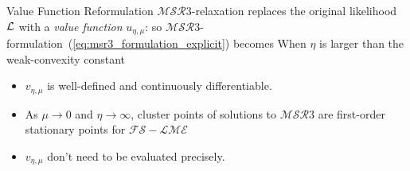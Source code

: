 \documentclass[8pt]{beamer}
\newcommand{\ouralgo}{\ensuremath{\mathcal{MSR}3}}
\begin{document}
\begin{frame}{Value Function Reformulation}
$\ouralgo$-relaxation replaces the original likelihood $\operatorname{\mathcal{L}}$ with a \textit{value function} $u_{\eta,\mu}$:
so $\ouralgo$-formulation~(\ref{eq:msr3_formulation_explicit}) becomes
When $\eta$ is larger than the weak-convexity constant
\begin{itemize}
	\item $v_{\eta,\mu}$ is well-defined and continuously differentiable.
	\item As $\mu \rightarrow 0$ and $\eta \rightarrow \infty$, cluster points of solutions to $\ouralgo$ are first-order stationary points for $\mathcal{FS-LME}$ \\ 
	\item $v_{\eta, \mu}$ don't need to be evaluated precisely.
\end{itemize}

\end{frame}

\end{document}
